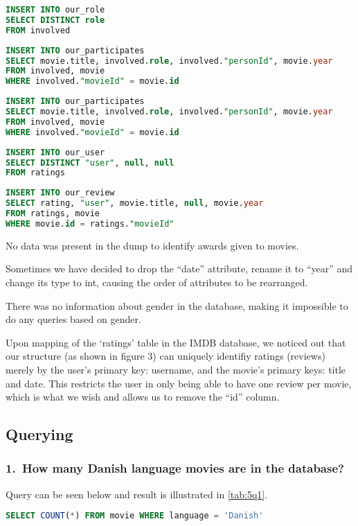 \begin{lstlisting}[language=SQL]
INSERT INTO our_role
SELECT DISTINCT role
FROM involved
\end{lstlisting}

\begin{lstlisting}[language=SQL]
INSERT INTO our_participates
SELECT movie.title, involved.role, involved."personId", movie.year
FROM involved, movie
WHERE involved."movieId" = movie.id
\end{lstlisting}

\begin{lstlisting}[language=SQL]
INSERT INTO our_participates
SELECT movie.title, involved.role, involved."personId", movie.year
FROM involved, movie
WHERE involved."movieId" = movie.id
\end{lstlisting}

\begin{lstlisting}[language=SQL]
INSERT INTO our_user
SELECT DISTINCT "user", null, null
FROM ratings
\end{lstlisting}

\begin{lstlisting}[language=SQL]
INSERT INTO our_review
SELECT rating, "user", movie.title, null, movie.year
FROM ratings, movie
WHERE movie.id = ratings."movieId"
\end{lstlisting}

No data was present in the dump to identify awards given to movies.

Sometimes we have decided to drop the “date” attribute, rename it to ``year'' and change its type to int, causing the order of attributes to be rearranged.

There was no information about gender in the database, making it impossible to do any queries based on gender.

Upon mapping of the ‘ratings’ table in the IMDB database, we noticed out that our structure (as shown in figure 3) can uniquely identifiy ratings (reviews) merely by the user’s primary key: username, and the movie’s primary keys: title and date. This restricts the user in only being able to have one review per movie, which is what we wish and allows us to remove the ``id'' column.

\subsection{Querying}

\subsubsection{1.\ How many Danish language movies are in the database?}
Query can be seen below and result is illustrated in \cref{tab:5q1}.
\begin{lstlisting}[language=SQL]
SELECT COUNT(*) FROM movie WHERE language = 'Danish'
\end{lstlisting}

